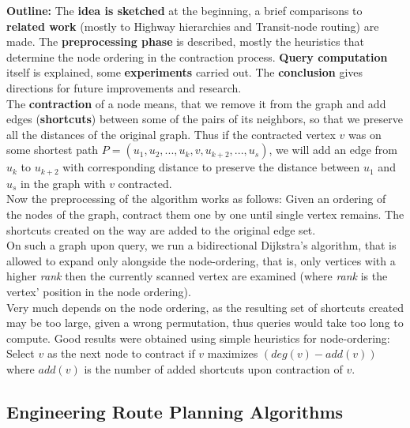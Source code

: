 \documentclass[a4paper]{article}
\newcommand{\textbff}[1]{{\large \textbf{#1}}}
\begin{document}
        \textbff{Outline:} The \textbf{idea is sketched} at the beginning, a brief comparisons to \textbf{related work} (mostly to Highway hierarchies and Transit-node routing) are made. The \textbf{preprocessing phase} is described, mostly the heuristics that determine the node ordering in the contraction process. \textbf{Query computation} itself is explained, some \textbf{experiments} carried out. The \textbf{conclusion} gives directions for future improvements and research.\\

        The \textbf{contraction} of a node means, that we remove it from the graph and add edges (\textbf{shortcuts}) between some of the pairs of its neighbors, so that we preserve all the distances of the original graph. Thus if the contracted vertex $v$ was on some shortest path $P = (u_1, u_2, ... , u_k, v, u_{k + 2}, ... ,u_s)$, we will add an edge from $u_k$ to $u_{k + 2}$ with corresponding distance to preserve the distance between $u_1$ and $u_s$ in the graph with $v$ contracted. \\

        Now the preprocessing of the algorithm works as follows: Given an ordering of the nodes of the graph, contract them one by one until single vertex remains. The shortcuts created on the way are added to the original edge set. \\

        On such a graph upon query, we run a bidirectional Dijkstra's algorithm, that is allowed to expand only alongside the node-ordering, that is, only vertices with a higher \emph{rank} then the currently scanned vertex are examined (where \emph{rank} is the vertex' position in the node ordering). \\

        Very much depends on the node ordering, as the resulting set of shortcuts created may be too large, given a wrong permutation, thus queries would take too long to compute. Good results were obtained using simple heuristics for node-ordering: Select $v$ as the next node to contract if $v$ maximizes $(deg(v) - add(v))$ where $add(v)$ is the number of added shortcuts upon contraction of $v$.

        \subsection{Engineering Route Planning Algorithms}
        \label{subsec:engineeringroute}
\end{document}
